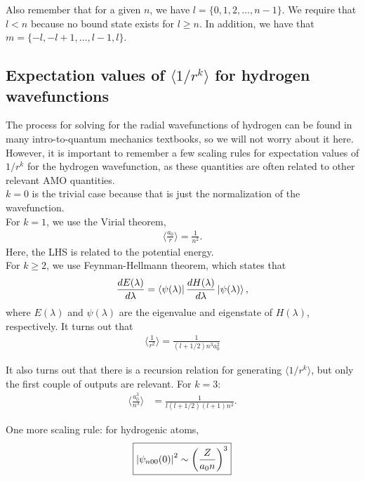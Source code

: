 \documentclass{book}
\theoremstyle{definition}
\newcommand{\f}[2]{\frac{#1}{#2}}
\newcommand{\lp}{\left(}
\newcommand{\rp}{\right)}
\begin{document}
Also remember that for a given $n$, we have $l = \{0,1,2,\dots, n-1\}$. We require that $l<n$ because no bound state exists for $l \geq n$. In addition, we have that $m = \{ -l,-l+1,\dots, l-1,l \}$.


\subsection{Expectation values of $\langle 1/r^k\rangle$ for hydrogen wavefunctions}

The process for solving for the radial wavefunctions of hydrogen can be found in many intro-to-quantum mechanics textbooks, so we will not worry about it here. However, it is important to remember a few scaling rules for expectation values of $1/r^k$ for the hydrogen wavefunction, as these quantities are often related to other relevant AMO quantities. \\

$k=0$ is the trivial case because that is just the normalization of the wavefunction. \\

For $k=1$, we use the Virial theorem, 
\begin{align*}
	\bigg\langle \f{a_0}{r}\bigg\rangle = \f{1}{n^2}.
\end{align*}
Here, the LHS is related to the potential energy.\\

For $k \geq 2$, we use Feynman-Hellmann theorem, which states that
\begin{align*}
	\f{dE(\lambda)}{d\lambda} = \bra{\psi(\lambda)} \f{dH(\lambda)}{d\lambda} \ket{\psi(\lambda)},
\end{align*}
where $E(\lambda)$ and $\psi(\lambda)$ are the eigenvalue and eigenstate of $H(\lambda)$, respectively. It turns out that
\begin{align*}
	\bigg\langle \f{1}{r^2} \bigg\rangle =   \f{1}{(l+1/2) n^3 a_0^2}
\end{align*}

It also turns out that there is a recursion relation for generating $\langle 1/r^k\rangle$, but only the first couple of outputs are relevant. For $k=3$:
\begin{align*}
	\bigg\langle \f{a_0^3}{n^3} \bigg\rangle &=  \f{1}{l(l+1/2)(l+1) n^3}.
\end{align*}

One more scaling rule: for hydrogenic atoms,
\begin{align*}
	\boxed{\abs{\psi_{n00}(0)}^2 \sim \lp \f{Z}{a_0 n} \rp^3}
\end{align*}
\end{document}
